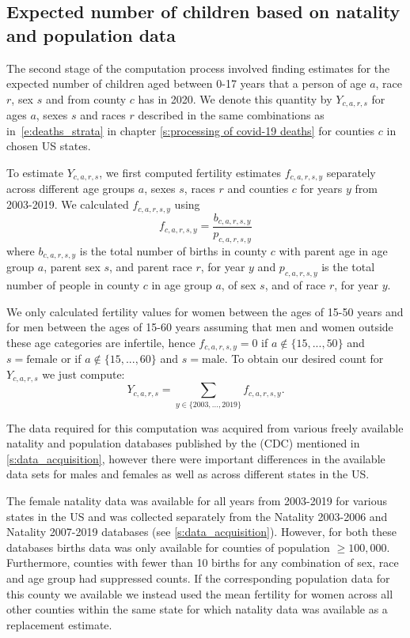 \documentclass[11pt]{article}
\begin{document}
\subsection{Expected number of children based on natality and population data}\label{s:number of children parents}

The second stage of the computation process involved finding estimates for the expected number of children aged between 0-17 years that a person of age $a$, race $r$, sex $s$ and from county $c$ has in 2020. We denote this quantity by $Y_{c,a,r,s}$ for ages $a$, sexes $s$ and races $r$ described in the same combinations as in~\eqref{e:deaths_strata} in chapter \ref{s:processing of covid-19 deaths} for counties $c$ in chosen US states. 

To estimate $Y_{c,a,r,s}$, we first computed fertility estimates $f_{c,a,r,s, y}$ separately across different age groups $a$, sexes $s$, races $r$ and counties $c$ for years $y$ from 2003-2019. We calculated $f_{c,a,r,s, y}$ using
\begin{equation}
    f_{c, a, r, s, y}= \frac{b_{c,a,r,s, y}}{p_{c,a,r,s, y}}
\end{equation}
where $b_{c, a, r, s, y}$ is the total number of births in county $c$ with parent age in age group $a$, parent sex $s$, and parent race $r$, for year $y$ and $p_{c,a,r,s, y}$ is the total number of people in county $c$ in age group $a$, of sex $s$, and of race $r$, for year $y$.

We only calculated fertility values for women between the ages of 15-50 years and for men between the ages of 15-60 years assuming that men and women outside these age categories are infertile, hence $f_{c, a, r, s, y} = 0$ if $a \notin\{15, ..., 50\} $ and $s = \textrm{female}$ or if $a \notin\{15, ..., 60\}$ and $s = \textrm{male}$. To obtain our desired count for $Y_{c,a,r,s}$ we just compute:
\begin{equation}
    Y_{c,a,r,s} = \sum_{y \in \{2003, ..., 2019\}} f_{c, a, r, s, y}.
\end{equation}

The data required for this computation was acquired from various freely available natality and population databases published by the (CDC) mentioned in \ref{s:data_acquisition}, however there were important differences in the available data sets for males and females as well as across different states in the US.

The female natality data was available for all years from 2003-2019 for various states in the US and was collected separately from the Natality 2003-2006 and Natality 2007-2019 databases (see \ref{s:data_acquisition}). However, for both these databases births data was only available for counties of population $\geq 100,000$. Furthermore, counties with fewer than 10 births for any combination of sex, race and age group had suppressed counts. If the corresponding population data for this county we available we instead used the mean fertility for women across all other counties within the same state for which natality data was available as a replacement estimate.
\end{document}
